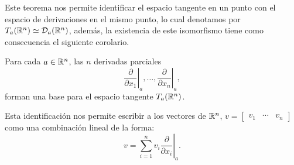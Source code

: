 Este teorema nos permite identificar el espacio tangente en un punto con el espacio de derivaciones en el mismo punto, lo cual denotamos por $T_a(\mathbb{R}^n) \simeq \mathcal{D}_a(\mathbb{R}^n)$, además, la existencia de este isomorfismo tiene como consecuencia el siguiente corolario.

\begin{corollary}\label{Corolario: Base de TpRn}
	Para cada $a \in \mathbb{R}^n$, las $n$ derivadas parciales
	\[
		\left. \frac{\partial }{\partial x_1} \right|_{a}, \dots, \left. \frac{\partial }{\partial x_n} \right|_{a},
	\]
	forman una base para el espacio tangente $T_a(\mathbb{R}^n)$.
\end{corollary}

Esta identificación nos permite escribir a los vectores de $\mathbb{R}^n$, $v = \begin{bmatrix} v_1 & \cdots & v_n \end{bmatrix}$ como una combinación lineal de la forma:
\[ 	v = \left. \sum_{i = 1}^{n} v_i \frac{\partial}{\partial x_i} \right|_{a}.\]
